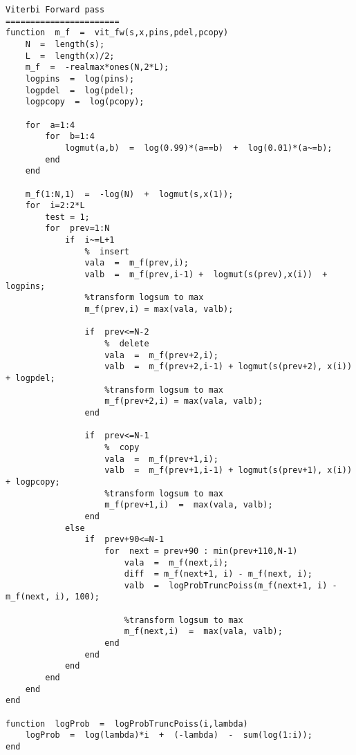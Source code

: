 \documentclass{article}
\begin{document}
\begin{verbatim}
Viterbi Forward pass
=======================
function  m_f  =  vit_fw(s,x,pins,pdel,pcopy)
    N  =  length(s);
    L  =  length(x)/2;
    m_f  =  -realmax*ones(N,2*L);
    logpins  =  log(pins);
    logpdel  =  log(pdel);
    logpcopy  =  log(pcopy);

    for  a=1:4
        for  b=1:4
            logmut(a,b)  =  log(0.99)*(a==b)  +  log(0.01)*(a~=b);
        end
    end

    m_f(1:N,1)  =  -log(N)  +  logmut(s,x(1));
    for  i=2:2*L
        test = 1;
        for  prev=1:N
            if  i~=L+1
                %  insert
                vala  =  m_f(prev,i);
                valb  =  m_f(prev,i-1) +  logmut(s(prev),x(i))  +  logpins;
                %transform logsum to max
                m_f(prev,i) = max(vala, valb);

                if  prev<=N-2
                    %  delete
                    vala  =  m_f(prev+2,i);
                    valb  =  m_f(prev+2,i-1) + logmut(s(prev+2), x(i)) + logpdel;
                    %transform logsum to max
                    m_f(prev+2,i) = max(vala, valb);
                end

                if  prev<=N-1
                    %  copy
                    vala  =  m_f(prev+1,i);
                    valb  =  m_f(prev+1,i-1) + logmut(s(prev+1), x(i)) + logpcopy;
                    %transform logsum to max
                    m_f(prev+1,i)  =  max(vala, valb);
                end
            else
                if  prev+90<=N-1
                    for  next = prev+90 : min(prev+110,N-1)
                        vala  =  m_f(next,i);   
                        diff  = m_f(next+1, i) - m_f(next, i);
                        valb  =  logProbTruncPoiss(m_f(next+1, i) - m_f(next, i), 100);
                        
                        %transform logsum to max
                        m_f(next,i)  =  max(vala, valb);
                    end
                end
            end
        end
    end
end

function  logProb  =  logProbTruncPoiss(i,lambda)       
    logProb  =  log(lambda)*i  +  (-lambda)  -  sum(log(1:i));   
end
\end{verbatim}
\end{document}
